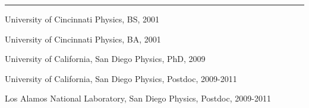 
\rule[3pt]{342pt}{.1mm}

\noindent
University of Cincinnati \hfill Physics, BS, 2001

\noindent
University of Cincinnati \hfill Physics, BA, 2001

\noindent
University of California, San Diego \hfill Physics, PhD, 2009

\noindent
University of California, San Diego \hfill Physics, Postdoc, 2009-2011

\noindent
Los Alamos National Laboratory, San Diego \hfill Physics, Postdoc, 2009-2011

\medskip
